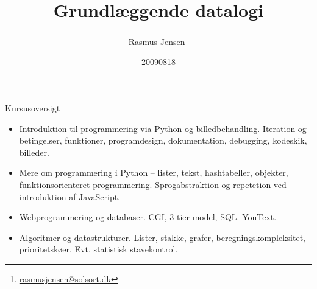 \documentclass[a4paper,landscape]{slides}
\title{Grundlæggende datalogi}
\author{Rasmus Jensen\footnote{\url{rasmusjensen@solsort.dk}}}
\date{20090818}
\begin{document}

\begin{slide}
	\begin{center} {\large 
            Kursusoversigt
	} \end{center}
	\begin{itemize} \addtolength{\itemsep}{-\baselineskip}
    		\item Introduktion til programmering via Python og billedbehandling. Iteration og betingelser, funktioner, programdesign, dokumentation, debugging, kodeskik, billeder.
    		\item Mere om programmering i Python -- lister, tekst, hashtabeller, objekter, funktionsorienteret programmering. Sprogabstraktion og repetetion ved introduktion af JavaScript.
    		\item Webprogrammering og databaser. CGI, 3-tier model, SQL. YouText.
    		\item Algoritmer og datastrukturer. Lister, stakke, grafer, beregningskompleksitet, prioritetskøer. Evt. statistisk stavekontrol.
	\end{itemize}
\end{slide}
\end{document}
